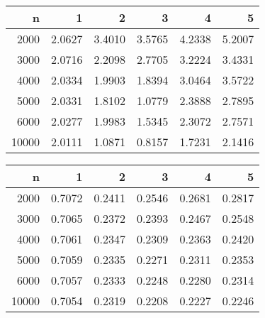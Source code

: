 \begin{table}[ht]
\centering
\begin{tabular}{rrrrrr}
  \hline
n & 1 & 2 & 3 & 4 & 5 \\ 
  \hline
2000 & 2.0627 & 3.4010 & 3.5765 & 4.2338 & 5.2007 \\ 
  3000 & 2.0716 & 2.2098 & 2.7705 & 3.2224 & 3.4331 \\ 
  4000 & 2.0334 & 1.9903 & 1.8394 & 3.0464 & 3.5722 \\ 
  5000 & 2.0331 & 1.8102 & 1.0779 & 2.3888 & 2.7895 \\ 
  6000 & 2.0277 & 1.9983 & 1.5345 & 2.3072 & 2.7571 \\ 
  10000 & 2.0111 & 1.0871 & 0.8157 & 1.7231 & 2.1416 \\ 
   \hline
\end{tabular}
\end{table}
\begin{table}[ht]
\centering
\begin{tabular}{rrrrrr}
  \hline
n & 1 & 2 & 3 & 4 & 5 \\ 
  \hline
2000 & 0.7072 & 0.2411 & 0.2546 & 0.2681 & 0.2817 \\ 
  3000 & 0.7065 & 0.2372 & 0.2393 & 0.2467 & 0.2548 \\ 
  4000 & 0.7061 & 0.2347 & 0.2309 & 0.2363 & 0.2420 \\ 
  5000 & 0.7059 & 0.2335 & 0.2271 & 0.2311 & 0.2353 \\ 
  6000 & 0.7057 & 0.2333 & 0.2248 & 0.2280 & 0.2314 \\ 
  10000 & 0.7054 & 0.2319 & 0.2208 & 0.2227 & 0.2246 \\ 
   \hline
\end{tabular}
\end{table}
